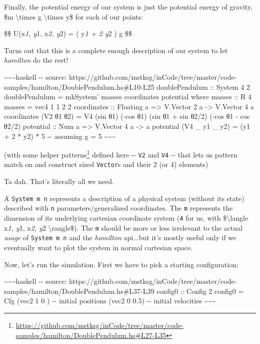 \documentclass[]{article}
\renewcommand{\href}[2]{#2\footnote{\url{#1}}}
\begin{document}
Finally, the potential energy of our system is just the potential energy of
gravity, \$m \textbackslash{}times g \textbackslash{}times y\$ for each of our
points:

\$\$ U(x\emph{1, y}1, x\emph{2, y}2) = ( y\emph{1 + 2 y}2 ) g \$\$

Turns out that this is a complete enough description of our system to let
\emph{hamilton} do the rest!

\textasciitilde{}\textasciitilde{}\textasciitilde{}haskell -\/- source:
https://github.com/mstksg/inCode/tree/master/code-samples/hamilton/DoublePendulum.hs\#L10-L25
doublePendulum :: System 4 2 doublePendulum = mkSystem' masses coordinates
potential where masses :: R 4 masses = vec4 1 1 2 2 coordinates :: Floating a
=\textgreater{} V.Vector 2 a -\textgreater{} V.Vector 4 a coordinates (V2 θ1 θ2)
= V4 (sin θ1) (-cos θ1) (sin θ1 + sin θ2/2) (-cos θ1 - cos θ2/2) potential ::
Num a =\textgreater{} V.Vector 4 a -\textgreater{} a potential (V4 \_ y1 \_ y2)
= (y1 + 2 * y2) * 5 -\/- assuming g = 5
\textasciitilde{}\textasciitilde{}\textasciitilde{}

(with some
\href{https://github.com/mstksg/inCode/tree/master/code-samples/hamilton/DoublePendulum.hs\#L27-L35}{helper
patterns} defined here -\/- \texttt{V2} and \texttt{V4} -\/- that lets us
pattern match on and construct sized \texttt{Vector}s and their 2 (or 4)
elements)

Ta dah. That's literally all we need.

A \texttt{System\ m\ n} represents a description of a physical system (without
its state) described with \texttt{n} parameters/generalized coordinates. The
\texttt{m} represents the dimension of its underlying cartesian coordinate
system (\texttt{4} for us, with \$\textbackslash{}langle x\emph{1, y}1,
x\emph{2, y}2 \textbackslash{}rangle\$). The \texttt{m} should be more or less
irrelevant to the actual \emph{usage} of \texttt{System\ m\ n} and the
\emph{hamilton} api...but it's mostly useful only if we eventually want to plot
the system in normal cartesian space.

Now, let's run the simulation. First we have to pick a starting configuration:

\textasciitilde{}\textasciitilde{}\textasciitilde{}haskell -\/- source:
https://github.com/mstksg/inCode/tree/master/code-samples/hamilton/DoublePendulum.hs\#L37-L39
config0 :: Config 2 config0 = Cfg (vec2 1 0 ) -\/- initial positions (vec2 0
0.5) -\/- initial velocities \textasciitilde{}\textasciitilde{}\textasciitilde{}
\end{document}
